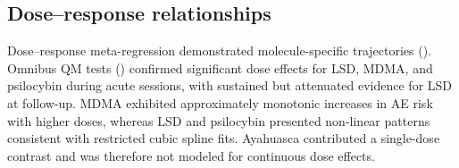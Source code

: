 

\subsection{Dose--response relationships}
Dose--response meta-regression demonstrated molecule-specific trajectories (). Omnibus QM tests () confirmed significant dose effects for LSD, MDMA, and psilocybin during acute sessions, with sustained but attenuated evidence for LSD at follow-up. MDMA exhibited approximately monotonic increases in AE risk with higher doses, whereas LSD and psilocybin presented non-linear patterns consistent with restricted cubic spline fits. Ayahuasca contributed a single-dose contrast and was therefore not modeled for continuous dose effects.

